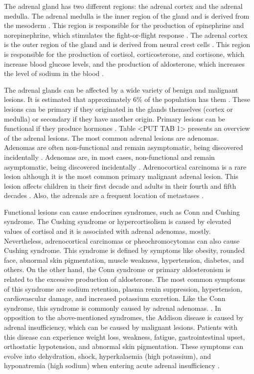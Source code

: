\documentclass{article}
\begin{document}
The adrenal gland has two different regions: the adrenal cortex and the adrenal medulla. The adrenal medulla is the inner region of the gland and is derived from the mesoderm \cite{Baba2012}. This region is responsible for the production of epinephrine and norepinephrine, which stimulates the fight-or-flight response \cite{openstax}. The adrenal cortex is the outer region of the gland and is derived from neural crest cells \cite{Baba2012}. This region is responsible for the production of cortisol, corticosterone, and cortisone, which increase blood glucose levels, and the production of aldosterone, which increases the level of sodium in the blood \cite{openstax}.

The adrenal glands can be affected by a wide variety of benign and malignant lesions. It is estimated that approximately 6\% of the population has them \cite{Panda2015}. These lesions can be primary if they originated in the glands themselves (cortex or medulla) or secondary if they have another origin. Primary lesions can be functional if they produce hormones \cite{Panda2015}. Table <PUT TAB 1> presents an overview of the adrenal lesions. The most common adrenal lesions are adenomas. Adenomas are often non-functional and remain asymptomatic, being discovered incidentally \cite{Wang2018}. Adenomas are, in most cases, non-functional and remain asymptomatic, being discovered incidentally \cite{Platzek2019}. Adrenocortical carcinoma is a rare lesion although it is the most common primary malignant adrenal lesion. This lesion affects children in their first decade and adults in their fourth and fifth decades \cite{Panda2015}. Also, the adrenals are a frequent location of metastases \cite{Platzek2019}.

Functional lesions can cause endocrines syndromes, such as Conn and Cushing syndrome. The Cushing syndrome or hypercortisolism is caused by elevated values of cortisol and it is associated with adrenal adenomas, mostly. Nevertheless, adrenocortical carcinomas or pheochromocytomas can also cause Cushing syndrome. This syndrome is defined by symptoms like obesity, rounded face, abnormal skin pigmentation, muscle weakness, hypertension, diabetes, and others. On the other hand, the Conn syndrome or primary aldosteronism is related to the excessive production of aldosterone. The most common symptoms of this syndrome are sodium retention, plasma renin suppression, hypertension, cardiovascular damage, and increased potassium excretion. Like the Conn syndrome, this syndrome is commonly caused by adrenal adenomas.  .  In opposition to the above-mentioned syndromes, the Addison disease is caused by adrenal insufficiency, which can be caused by malignant lesions. Patients with this disease can experience weight loss, weakness, fatigue, gastrointestinal upset, orthostatic hypotension, and abnormal skin pigmentation. These symptoms can evolve into dehydration, shock, hyperkalaemia (high potassium), and hyponatremia (high sodium) when entering acute adrenal insufficiency \cite{Wang2018}.
\end{document}
